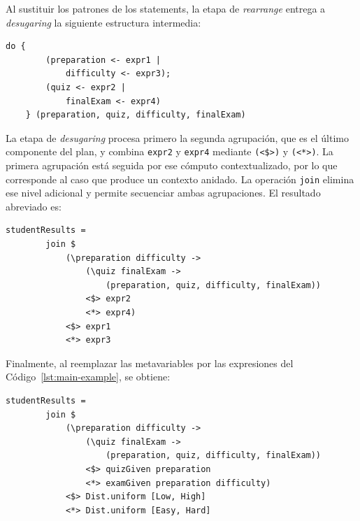 Al sustituir los patrones de los statements, la etapa de \textit{rearrange} entrega a \textit{desugaring} la siguiente estructura intermedia:

\begin{lstlisting}[style=haskell,caption={Plan intermedio producido por \textit{rearrange} para el reordenamiento válido \texttt{[1,3,2,4]}.},label={lst:problema-main-example-reordered-plan}]
    do {
        (preparation <- expr1 |
            difficulty <- expr3);
        (quiz <- expr2 |
            finalExam <- expr4)
    } (preparation, quiz, difficulty, finalExam)
\end{lstlisting}

La etapa de \textit{desugaring} procesa primero la segunda agrupación, que es el último componente del plan, y combina \texttt{expr2} y \texttt{expr4} mediante \verb|(<$>)| y \verb|(<*>)|. La primera agrupación está seguida por ese cómputo contextualizado, por lo que corresponde al caso que produce un contexto anidado. La operación \texttt{join} elimina ese nivel adicional y permite secuenciar ambas agrupaciones. El resultado abreviado es:

\noindent\begin{minipage}{\textwidth}
\begin{lstlisting}[style=haskell,caption={Desazucarado del plan obtenido a partir del reordenamiento válido \texttt{[1,3,2,4]}, expresado mediante \texttt{expr1}--\texttt{expr4}.},label={lst:problema-main-example-reordered-desugared-abstract}]
    studentResults =
        join $
            (\preparation difficulty ->
                (\quiz finalExam ->
                    (preparation, quiz, difficulty, finalExam))
                <$> expr2
                <*> expr4)
            <$> expr1
            <*> expr3
\end{lstlisting}
\end{minipage}

Finalmente, al reemplazar las metavariables por las expresiones del Código~\ref{lst:main-example}, se obtiene:

\begin{lstlisting}[style=haskell,caption={Desazucarado aplicativo del modelo probabilístico obtenido a partir del reordenamiento válido \texttt{[1,3,2,4]}.},label={lst:problema-main-example-reordered-desugared}]
    studentResults =
        join $
            (\preparation difficulty ->
                (\quiz finalExam ->
                    (preparation, quiz, difficulty, finalExam))
                <$> quizGiven preparation
                <*> examGiven preparation difficulty)
            <$> Dist.uniform [Low, High]
            <*> Dist.uniform [Easy, Hard]
\end{lstlisting}

